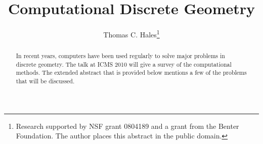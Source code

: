 \documentclass{llncs}
\begin{document}
\mainmatter
\title{Computational Discrete Geometry}
\author{Thomas C. Hales\thanks{Research supported by NSF grant 0804189 and a grant from the Benter Foundation.  The author places this abstract in the
public domain.}}
%
%
\maketitle




\begin{abstract} 
  In recent years, computers have been used regularly to solve major
  problems in discrete geometry.  The talk at ICMS 2010 will give a
  survey of the computational methods.  The extended abstract that is
  provided below mentions a few of the problems that will be
  discussed.
\end{abstract}


\def\tikzfig#1#2#3{%
\begin{figure}[htb]%
  \centering
\begin{tikzpicture}#3
\end{tikzpicture}
  \caption{#2}
  \label{fig:#1}%
\end{figure}%
}
\def\op#1{{\operatorname{#1}}}
\newcommand{\ring}[1]{\mathbb{#1}}




\raggedright

\end{document}
